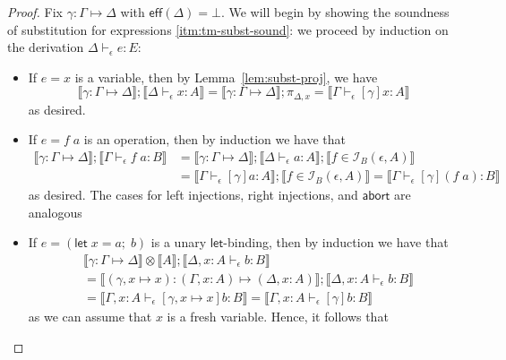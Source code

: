 \documentclass[acmsmall,screen,review]{acmart}
\newcommand{\mc}[1]{\ensuremath{\mathcal{#1}}}
\newcommand{\ms}[1]{\ensuremath{\mathsf{#1}}}
\newcommand{\letexpr}[3]{\ensuremath{\ms{let}\;#1 = #2;\;#3}}
\newcommand{\bhyp}[2]{#1 : #2}
\newcommand{\hasty}[4]{#1 \vdash_{#2} #3: {#4}}
\newcommand{\isop}[4]{#1 \in \mc{I}_{#4}(#2, #3)}
\newcommand{\issubst}[3]{#1: #2 \mapsto #3}
\newcommand{\dnt}[1]{\llbracket{#1}\rrbracket}
\begin{document}
\begin{proof}
  Fix $\issubst{\gamma}{\Gamma}{\Delta}$ with $\ms{eff}(\Delta) = \bot$. We will begin by showing
  the soundness of substitution for expressions \ref{itm:tm-subst-sound}: we proceed by induction
  on the derivation $\hasty{\Delta}{\epsilon}{e}{E}$:
  \begin{itemize}[leftmargin=*]
    \item If $e = x$ is a variable, then by Lemma~\ref{lem:subst-proj}, we have
    \begin{equation}
      \dnt{\issubst{\gamma}{\Gamma}{\Delta}} ; \dnt{\hasty{\Delta}{\epsilon}{x}{A}} 
      = \dnt{\issubst{\gamma}{\Gamma}{\Delta}} ; \pi_{\Delta, x}
      = \dnt{\hasty{\Gamma}{\epsilon}{[\gamma]x}{A}}
    \end{equation}
    as desired.
    \item If $e = f\;a$ is an operation, then by induction we have that
    \begin{equation}
      \begin{aligned}
      \dnt{\issubst{\gamma}{\Gamma}{\Delta}} ; \dnt{\hasty{\Gamma}{\epsilon}{f\;a}{B}}
      &= \dnt{\issubst{\gamma}{\Gamma}{\Delta}} 
      ; \dnt{\hasty{\Delta}{\epsilon}{a}{A}} 
      ; \dnt{\isop{f}{\epsilon}{A}{B}}
      \\ &= \dnt{\hasty{\Gamma}{\epsilon}{[\gamma]a}{A}}
      ; \dnt{\isop{f}{\epsilon}{A}{B}}
      = \dnt{\hasty{\Gamma}{\epsilon}{[\gamma](f\;a)}{B}}
      \end{aligned}
    \end{equation}
    as desired. The cases for left injections, right injections, and \ms{abort} are analogous
    \item If $e = (\letexpr{x}{a}{b})$ is a unary \ms{let}-binding, then by induction we have that
    \begin{equation}
      \begin{aligned}
      & \dnt{\issubst{\gamma}{\Gamma}{\Delta}} \otimes \dnt{A} 
      ; \dnt{\hasty{\Delta, \bhyp{x}{A}}{\epsilon}{b}{B}}
      \\ &= \dnt{\issubst{(\gamma, x \mapsto x)}{(\Gamma, \bhyp{x}{A})}{(\Delta, \bhyp{x}{A})}}
      ; \dnt{\hasty{\Delta, \bhyp{x}{A}}{\epsilon}{b}{B}}
      \\ &= \dnt{\hasty{\Gamma, \bhyp{x}{A}}{\epsilon}{[\gamma, x \mapsto x]b}{B}}
          = \dnt{\hasty{\Gamma, \bhyp{x}{A}}{\epsilon}{[\gamma]b}{B}}
      \end{aligned}
    \end{equation}
    as we can assume that $x$ is a fresh variable. Hence, it follows that

\end{itemize}
\end{proof}
\end{document}
